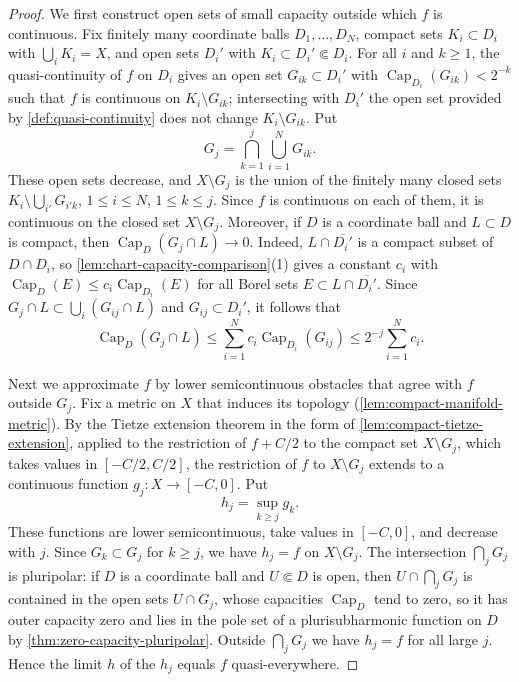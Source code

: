 \begin{proof}
We first construct open sets of small capacity outside which $f$ is continuous. Fix finitely many coordinate balls $D_1,\ldots,D_N$, compact sets $K_i\subset D_i$ with $\bigcup_iK_i=X$, and open sets $D_i'$ with $K_i\subset D_i'\Subset D_i$. For all $i$ and $k\geq1$, the quasi-continuity of $f$ on $D_i$ gives an open set $G_{ik}\subset D_i'$ with $\operatorname{Cap}_{D_i}(G_{ik})<2^{-k}$ such that $f$ is continuous on $K_i\setminus G_{ik}$; intersecting with $D_i'$ the open set provided by \cref{def:quasi-continuity} does not change $K_i\setminus G_{ik}$. Put
\[
 G_j=\bigcap_{k=1}^j\bigcup_{i=1}^NG_{ik}.
\]
These open sets decrease, and $X\setminus G_j$ is the union of the finitely many closed sets $K_i\setminus\bigcup_{i'}G_{i'k}$, $1\leq i\leq N$, $1\leq k\leq j$. Since $f$ is continuous on each of them, it is continuous on the closed set $X\setminus G_j$. Moreover, if $D$ is a coordinate ball and $L\subset D$ is compact, then $\operatorname{Cap}_D(G_j\cap L)\to0$. Indeed, $L\cap\overline{D_i'}$ is a compact subset of $D\cap D_i$, so \cref{lem:chart-capacity-comparison}(1) gives a constant $c_i$ with $\operatorname{Cap}_D(E)\leq c_i\operatorname{Cap}_{D_i}(E)$ for all Borel sets $E\subset L\cap\overline{D_i'}$. Since $G_j\cap L\subset\bigcup_i(G_{ij}\cap L)$ and $G_{ij}\subset D_i'$, it follows that
\[
 \operatorname{Cap}_D(G_j\cap L)\leq\sum_{i=1}^Nc_i\operatorname{Cap}_{D_i}(G_{ij})\leq2^{-j}\sum_{i=1}^Nc_i.
\]

Next we approximate $f$ by lower semicontinuous obstacles that agree with $f$ outside $G_j$. Fix a metric on $X$ that induces its topology (\cref{lem:compact-manifold-metric}). By the Tietze extension theorem in the form of \cref{lem:compact-tietze-extension}, applied to the restriction of $f+C/2$ to the compact set $X\setminus G_j$, which takes values in $[-C/2,C/2]$, the restriction of $f$ to $X\setminus G_j$ extends to a continuous function $g_j\colon X\to[-C,0]$. Put
\[
 h_j=\sup_{k\geq j}g_k.
\]
These functions are lower semicontinuous, take values in $[-C,0]$, and decrease with $j$. Since $G_k\subset G_j$ for $k\geq j$, we have $h_j=f$ on $X\setminus G_j$. The intersection $\bigcap_jG_j$ is pluripolar: if $D$ is a coordinate ball and $U\Subset D$ is open, then $U\cap\bigcap_jG_j$ is contained in the open sets $U\cap G_j$, whose capacities $\operatorname{Cap}_D$ tend to zero, so it has outer capacity zero and lies in the pole set of a plurisubharmonic function on $D$ by \cref{thm:zero-capacity-pluripolar}. Outside $\bigcap_jG_j$ we have $h_j=f$ for all large $j$. Hence the limit $h$ of the $h_j$ equals $f$ quasi-everywhere.


\end{proof}
